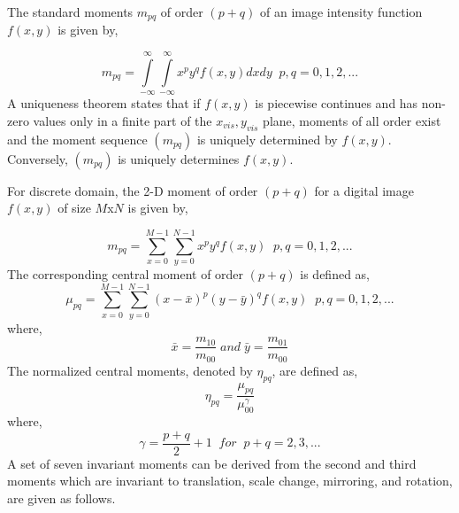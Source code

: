 The standard moments $m_{pq}$ of order $(p+q)$ of an image intensity function $f(x,y)$ is given by,

\begin{equation}\label{equation_moments}
m_{pq}=\int\limits_{-\infty}^{\infty}\int\limits_{-\infty}^{\infty}x^py^qf(x,y)dxdy \;\;  p,q = 0,1 , 2, ...
\end{equation}
A uniqueness theorem states that if $f(x,y)$ is piecewise continues and has non-zero values only in a finite part of the $x_{vis},y_{vis}$ plane, moments of all order exist and the moment sequence $(m_{pq})$ is uniquely determined by $f(x,y)$. Conversely, $(m_{pq})$ is uniquely determines $f(x,y)$.

For discrete domain, the 2-D moment of order $(p+q)$ for a digital image $f(x,y)$ of size $M$x$N$ is given by,

\begin{equation}\label{equation_digital_moments}
m_{pq}=\sum\limits_{x=0}^{M-1}\sum\limits_{y=0}^{N-1}x^py^qf(x,y) \;\;  p,q = 0,1 , 2, ...
\end{equation}
The corresponding central moment of order $(p+q)$ is defined as,
\begin{equation}\label{equation_central_digital_moments}
\mu_{pq}=\sum\limits_{x=0}^{M-1}\sum\limits_{y=0}^{N-1}(x-\bar{x})^p(y-\bar{y})^qf(x,y) \;\;  p,q = 0,1 , 2, ...
\end{equation}
where,
\begin{equation}\label{equation_xbar_ybar}
\bar{x}=\frac{m_{10}}{m_{00}} \; and \; \bar{y}=\frac{m_{01}}{m_{00}}
\end{equation}
The normalized central moments, denoted by $\eta_{pq}$, are defined as,
\begin{equation}\label{equation_central_normalized_moments}
\eta_{pq}=\frac{\mu_{pq}}{\mu^{\gamma}_{00}}
\end{equation}
where,
\begin{equation}\label{equation_gamma}
\gamma=\frac{p+q}{2}+1 \;\; for\;\; p+q=2,3,...
\end{equation}
A set of seven invariant moments can be derived from the second  and third moments \cite{Hu1962} which are invariant to translation, scale change, mirroring, and rotation, are given as follows.

